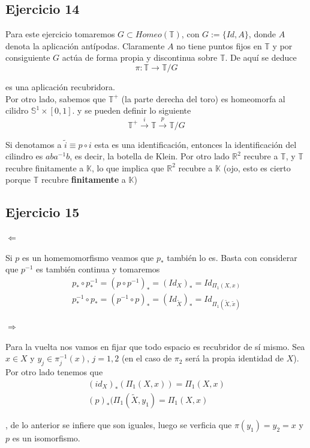 \documentclass{article}
\begin{document}
\subsection{Ejercicio 14}
Para este ejercicio tomaremos $G\subset Homeo(\mathbb{T})$, con $G:=\{Id, A\}$, donde $A$ denota la aplicación antípodas. Claramente $A$ no tiene puntos fijos en $\mathbb{T}$ y por consiguiente $G$ actúa de forma propia y discontinua sobre $\mathbb{T}$. De aquí se deduce
\begin{equation*}
\pi:\mathbb{T}\rightarrow \mathbb{T}/G
\end{equation*}

es una aplicación recubridora.\\

Por otro lado, sabemos que $\mathbb{T}^+$ (la parte derecha del toro) es homeomorfa al cilidro $\mathbb{S}^1\times [0,1]$. y se pueden definir lo siguiente
\begin{equation*}
\mathbb{T}^+\xrightarrow{i} \mathbb{T}\xrightarrow{p}\mathbb{T}/G
\end{equation*}

Si denotamos a $\tilde{i}\equiv p\circ i$ esta es una identificación, entonces la identificación del cilindro es $aba^{-1}b$, es decir, la botella de Klein. Por otro lado $\mathbb{R}^2$ recubre a $\mathbb{T}$, y $\mathbb{T}$ recubre finitamente a $\mathbb{K}$, lo que implica que $\mathbb{R}^2$ recubre a $\mathbb{K}$ (ojo, esto es cierto porque $\mathbb{T}$ recubre \textbf{finitamente} a $\mathbb{K}$)

\subsection{Ejercicio 15}
$\Leftarrow$

Si $p$ es un homemomorfismo veamos que $p_*$ también lo es. Basta con considerar que $p^{-1}$ es también continua y tomaremos
\begin{gather*}
p_*\circ p^{-1}_*=(p\circ p^{-1})_*=(Id_X)_*=Id_{\Pi_1(X,x)}\\
p^{-1}_*\circ p_*=(p^{-1}\circ p)_*=(Id_{\tilde{X}})_*=Id_{\Pi_1(\tilde{X},\tilde{x})}
\end{gather*}

$\Rightarrow$

Para la vuelta nos vamos en fijar que todo espacio es recubridor de sí mismo. Sea $x\in X$ y $y_j\in \pi_j^{-1}(x)$, $j=1,2$ (en el caso de $\pi_2$ será la propia identidad de $X$). Por otro lado tenemos que
\begin{gather*}
(id_X)_*(\Pi_1(X,x))=\Pi_1(X,x)\\
(p)_*(\Pi_1(\tilde{X},y_1)=\Pi_1(X,x)
\end{gather*}

, de lo anterior se infiere que son iguales, luego se verficia que $\pi(y_1)=y_2=x$ y $p$ es un isomorfismo. 
\end{document}
